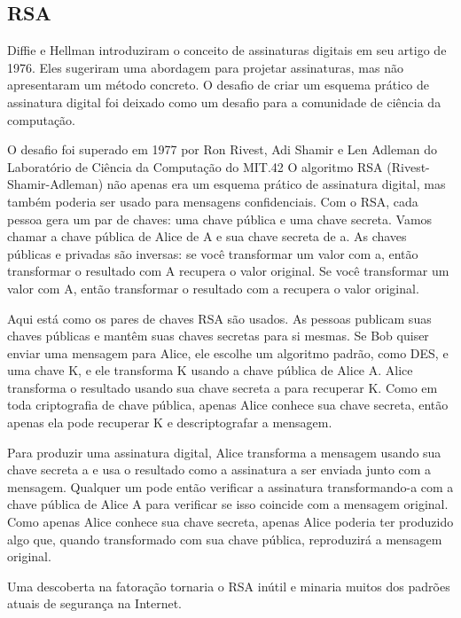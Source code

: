 \documentclass{book}
\begin{document}

\subsection{RSA}
\label{}

Diffie e Hellman introduziram o conceito de assinaturas digitais em seu artigo de 1976. Eles sugeriram uma abordagem para projetar assinaturas, mas não apresentaram um método concreto. O desafio de criar um esquema prático de assinatura digital foi deixado como um desafio para a comunidade de ciência da computação.

O desafio foi superado em 1977 por Ron Rivest, Adi Shamir e Len Adleman do Laboratório de Ciência da Computação do MIT.42 O algoritmo RSA (Rivest-Shamir-Adleman) não apenas era um esquema prático de assinatura digital, mas também poderia ser usado para mensagens confidenciais. Com o RSA, cada pessoa gera um par de chaves: uma chave pública e uma chave secreta. Vamos chamar a chave pública de Alice de A e sua chave secreta de a. As chaves públicas e privadas são inversas: se você transformar um valor com a, então transformar o resultado com A recupera o valor original. Se você transformar um valor com A, então transformar o resultado com a recupera o valor original.

Aqui está como os pares de chaves RSA são usados. As pessoas publicam suas chaves públicas e mantêm suas chaves secretas para si mesmas. Se Bob quiser enviar uma mensagem para Alice, ele escolhe um algoritmo padrão, como DES, e uma chave K, e ele transforma K usando a chave pública de Alice A. Alice transforma o resultado usando sua chave secreta a para recuperar K. Como em toda criptografia de chave pública, apenas Alice conhece sua chave secreta, então apenas ela pode recuperar K e descriptografar a mensagem.

Para produzir uma assinatura digital, Alice transforma a mensagem usando sua chave secreta a e usa o resultado como a assinatura a ser enviada junto com a mensagem. Qualquer um pode então verificar a assinatura transformando-a com a chave pública de Alice A para verificar se isso coincide com a mensagem original. Como apenas Alice conhece sua chave secreta, apenas Alice poderia ter produzido algo que, quando transformado com sua chave pública, reproduzirá a mensagem original.

Uma descoberta na fatoração tornaria o RSA inútil e minaria muitos dos padrões atuais de segurança na Internet.
\end{document}
